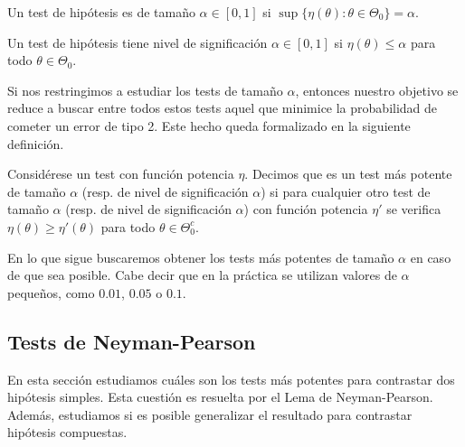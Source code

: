     \begin{definition}
        Un test de hipótesis es de tamaño $\alpha \in [0,1]$ si $\sup\{\eta(\theta): \theta \in \Theta_0\} = \alpha$.
    \end{definition}

    \begin{definition}
        Un test de hipótesis tiene nivel de significación $\alpha \in [0,1]$ si $\eta(\theta) \le \alpha$ para todo $\theta \in \Theta_0$.
    \end{definition}

    Si nos restringimos a estudiar los tests de tamaño $\alpha$, entonces nuestro objetivo se reduce a buscar entre todos estos tests aquel que minimice la probabilidad de cometer un error de tipo 2. Este hecho queda formalizado en la siguiente definición.

    \begin{definition}
        Considérese un test con función potencia $\eta$. Decimos que es un test más potente de tamaño $\alpha$ (resp. de nivel de significación $\alpha$)  si para cualquier otro test de tamaño $\alpha$ (resp. de nivel de significación $\alpha$) con función potencia $\eta'$ se verifica $\eta(\theta) \ge \eta'(\theta)$ para todo $\theta \in \Theta_0^c$.
    \end{definition}

    En lo que sigue buscaremos obtener los tests más potentes de tamaño $\alpha$ en caso de que sea posible. Cabe decir que en la práctica se utilizan valores de $\alpha$ pequeños, como $0.01$, $0.05$ o $0.1$.

    \subsection{Tests de Neyman-Pearson}

    En esta sección estudiamos cuáles son los tests más potentes para contrastar dos hipótesis simples. Esta cuestión es resuelta por el Lema de Neyman-Pearson. Además, estudiamos si es posible generalizar el resultado para contrastar hipótesis compuestas.

